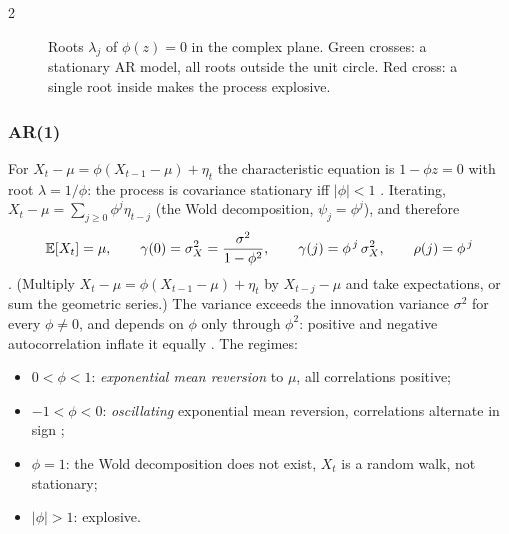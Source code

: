 \begin{paracol}{2}
\begin{figure}[ht]
\centering
{}
\caption{Roots $\lambda_j$ of $\phi(z)=0$ in the complex plane. Green crosses: a stationary AR model, all roots
outside the unit circle. Red cross: a single root inside makes the process explosive.}\label{ch09:fig-roots}
\end{figure}

\subsubsection{AR(1)}\label{ch09:sec-ar1}
For $X_t-\mu=\phi(X_{t-1}-\mu)+\eta_t$ the characteristic equation is $1-\phi z=0$ with root $\lambda=1/\phi$:
the process is covariance stationary iff $|\phi|<1$ . Iterating,
$X_t-\mu=\sum_{j\ge0}\phi^j\eta_{t-j}$ (the Wold decomposition, $\psi_j=\phi^j$), and therefore
\begin{equation}\label{ch09:eq-ar1}
  \mathbb{E}[X_t]=\mu,\qquad \gamma(0)=\sigma_X^2=\frac{\sigma^2}{1-\phi^2},\qquad
  \gamma(j)=\phi^{\,j}\,\sigma_X^2,\qquad \rho(j)=\phi^{\,j}
\end{equation}
. (Multiply $X_t-\mu=\phi(X_{t-1}-\mu)+\eta_t$ by $X_{t-j}-\mu$
and take expectations, or sum the geometric series.) The variance exceeds the innovation variance $\sigma^2$ for every
$\phi\neq0$, and depends on $\phi$ only through $\phi^2$: positive and negative autocorrelation inflate it equally
. The regimes:
\begin{itemize}
  \item $0<\phi<1$: \emph{exponential mean reversion} to $\mu$, all correlations positive;
  \item $-1<\phi<0$: \emph{oscillating} exponential mean reversion, correlations alternate in sign
        ;
  \item $\phi=1$: the Wold decomposition does not exist, $X_t$ is a random walk, not stationary;
  \item $|\phi|>1$: explosive.
\end{itemize}


\end{paracol}
